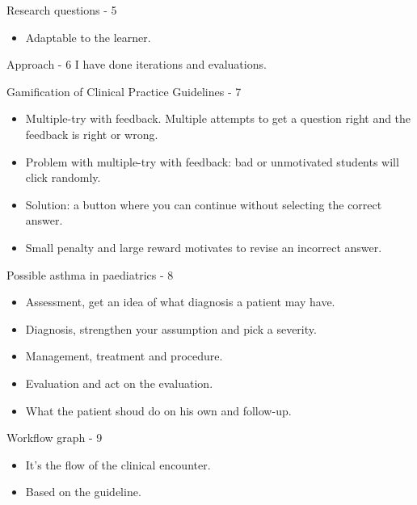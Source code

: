 \documentclass{beamer}
\begin{document}
\begin{frame}{Research questions - 5}
\begin{itemize}
	\item Adaptable to the learner.
\end{itemize}
\end{frame}

\begin{frame}{Approach - 6}
I have done iterations and evaluations.
\end{frame}


\begin{frame}{Gamification of Clinical Practice Guidelines - 7}
\begin{itemize}
	\item Multiple-try with feedback. Multiple attempts to get a question right and the feedback is right or wrong.
	\item Problem with multiple-try  with feedback: bad or unmotivated students will click randomly.
	\item Solution: a button where you can continue without selecting the correct answer.
	\item Small penalty and large reward motivates to revise an incorrect answer.
\end{itemize}
\end{frame}

\begin{frame}{Possible asthma in paediatrics - 8}
\begin{itemize}
	\item Assessment, get an idea of what diagnosis a patient may have.
	\item Diagnosis, strengthen your assumption and pick a severity.
	\item Management, treatment and procedure.
	\item Evaluation and act on the evaluation.
	\item What the patient shoud do on his own and follow-up.
\end{itemize}
\end{frame}

\begin{frame}{Workflow graph - 9}
\begin{itemize}
	\item It's the flow of the clinical encounter.
	\item Based on the guideline.
\end{itemize}
\end{frame}
\end{document}
